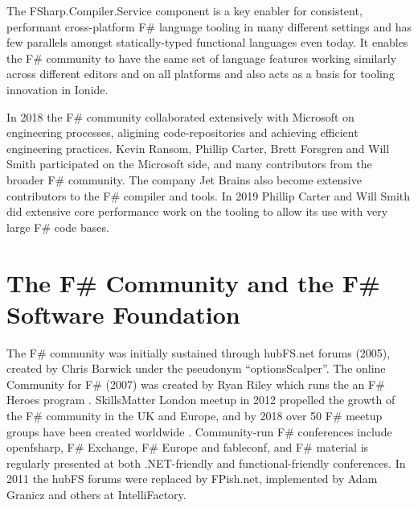 \documentclass[acmsmall,screen]{acmart}
\begin{document}
The FSharp.Compiler.Service component is a key enabler for consistent, performant cross-platform F\# language tooling in many different settings and
has few parallels amongst statically-typed  functional languages even today. It enables the F\# community to have the same set of language features working
similarly across different editors and on all platforms and also acts as a basis for tooling innovation in Ionide.

In 2018 the F\# community collaborated extensively with Microsoft on engineering processes, aligining code-repositories and
achieving efficient engineering practices.  Kevin Ransom, Phillip Carter, Brett Forsgren and Will Smith participated on the Microsoft side, and
many contributors from the broader F\# community.  The company Jet Brains also become extensive contributors to the F\# compiler and tools.
In 2019 Phillip Carter and Will Smith did extensive core performance work on the tooling to allow its use with very large F\# code bases.

\section*{The F\# Community and the F\# Software Foundation }

\label{page:community}

The F\# community was initially sustained through hubFS.net forums (2005), created by Chris Barwick under the
pseudonym “optionsScalper”. The online Community for F\# (2007) was created by Ryan Riley which runs the
an F\# Heroes program \citep{RefCommunityFSharp}.
SkillsMatter London meetup in 2012 propelled the growth of the F\# community in the UK and Europe, and by 2018
over 50 F\# meetup groups have been created worldwide \citep{RefMeetupds}.
Community-run F\# conferences include openfsharp, F\# Exchange, F\# Europe and fableconf, and F\# material is regularly presented at both .NET-friendly and functional-friendly conferences. In 2011 the hubFS forums were replaced by FPish.net, implemented by Adam Granicz and others at IntelliFactory. 
\end{document}
